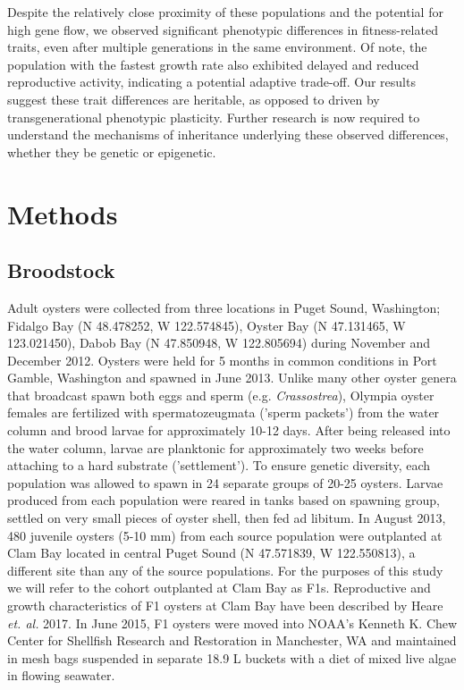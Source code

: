 \documentclass[fleqn,10pt]{wlscirep}
\begin{document}
Despite the relatively close proximity of these populations and the potential for high gene flow, we observed significant phenotypic differences in fitness-related traits, even after multiple generations in the same environment. Of note, the population with the fastest growth rate also exhibited delayed and reduced reproductive activity, indicating a potential adaptive trade-off. Our results suggest these trait differences are heritable, as opposed to driven by transgenerational phenotypic plasticity. Further research is now required to understand the mechanisms of inheritance underlying these observed differences, whether they be genetic or epigenetic. 

\section*{Methods}
\subsection*{Broodstock}
Adult oysters were collected from three locations in Puget Sound, Washington; Fidalgo Bay (N 48.478252, W 122.574845), Oyster Bay (N 47.131465, W 123.021450), Dabob Bay (N 47.850948, W 122.805694) during November and December 2012. Oysters were held for 5 months in common conditions in Port Gamble, Washington and spawned in June 2013. Unlike many other oyster genera that broadcast spawn both eggs and sperm (e.g. \textit{Crassostrea}), Olympia oyster females are fertilized with spermatozeugmata ('sperm packets') from the water column and brood larvae for approximately 10-12 days. After being released into the water column, larvae are planktonic for approximately two weeks before attaching to a hard substrate ('settlement'). To ensure genetic diversity, each population was allowed to spawn in 24 separate groups of 20-25 oysters. Larvae produced from each population were reared in tanks based on spawning group, settled on very small pieces of oyster shell, then fed ad libitum. In August 2013, 480 juvenile oysters (5-10 mm) from each source population were outplanted at Clam Bay located in central Puget Sound (N 47.571839, W 122.550813), a different site than any of the source populations. For the purposes of this study we will refer to the cohort outplanted at Clam Bay as F1s. Reproductive and growth characteristics of F1 oysters at Clam Bay have been described by Heare \textit{et. al.} 2017. In June 2015, F1 oysters were moved into NOAA's Kenneth K. Chew Center for Shellfish Research and Restoration in Manchester, WA and maintained in mesh bags suspended in separate 18.9 L buckets with a diet of mixed live algae in flowing seawater.
\end{document}
